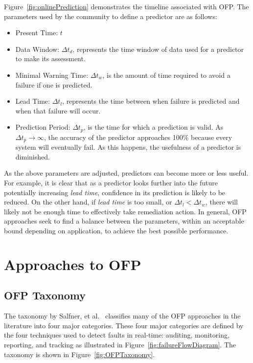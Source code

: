 Figure~\ref{fig:onlinePrediction} demonstrates the timeline associated with
\ac{OFP}.  The parameters used by the community to define a predictor are as
follows:
\begin{itemize}
	\item{Present Time: $t$}
  \item{Data Window: $\Delta t_{d}$, represents the time window of data used
  for a predictor to make its assessment.}
  \item{Minimal Warning Time: $\Delta t_{w}$, is the amount of time required to
  avoid a failure if one is predicted.}
  \item{Lead Time: $\Delta t_{l}$, represents the time between when failure is
  predicted and when that failure will occur.}
  \item{Prediction Period: $\Delta t_{p}$, is the time for which a prediction
  is valid.  As $\Delta t_{p} \rightarrow \infty$, the accuracy of the
  predictor approaches 100\% because every system will eventually fail.  As
  this happens, the usefulness of a predictor is diminished.}
\end{itemize}

As the above parameters are adjusted, predictors can become more or less
useful.  For example, it is clear that as a predictor looks further into the
future potentially increasing \emph{lead time}, confidence in its prediction is
likely to be reduced.  On the other hand, if \emph{lead time} is too small, or
$\Delta t_l < \Delta t_w$, there will likely not be enough time to effectively
take remediation action.  In general, \ac{OFP} approaches seek to find a
balance between the parameters, within an acceptable bound depending on
application, to achieve the best possible performance.

\section{Approaches to \ac{OFP}} \label{approaches}
\subsection{\ac{OFP} Taxonomy}
The taxonomy by Salfner, et al.~\cite{salfnerSurvey} classifies many of the
\ac{OFP} approaches in the literature into four major categories.  These four
major categories are defined by the four techniques used to detect faults in
real-time: auditing, monitoring, reporting, and tracking as illustrated in
Figure~\ref{fig:failureFlowDiagram}.  The taxonomy is shown in
Figure~\ref{fig:OFPTaxonomy}.

